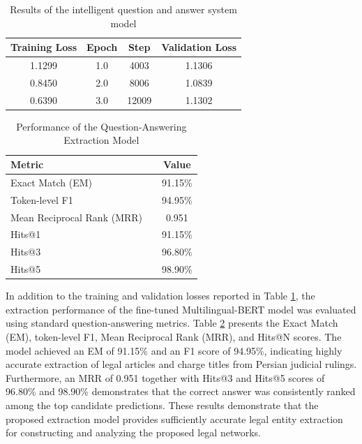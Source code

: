 \documentclass[twoside]{article}
\begin{document}
\begin{table}[!ht]
	\begin{center}
		\small
		\caption{Results of the intelligent question and answer system model}
		\label{tab1}
		\begin{tabular}{cccc}
			\hline
			\textbf{Training Loss} & \textbf{Epoch} & \textbf{Step} & \textbf{Validation Loss} \\
			\hline
			1.1299 & 1.0 & 4003 & 1.1306 \\
			0.8450 & 2.0 & 8006 & 1.0839 \\
			0.6390 & 3.0 & 12009 & 1.1302 \\
			\hline
		\end{tabular}
	\end{center}\vspace{-0.6cm}
\end{table}
\begin{table}[!ht]
	\begin{center}
		\small
		\caption{Performance of the Question-Answering Extraction Model}
		\label{tab2}
		\begin{tabular}{lcc}
			\hline
			\textbf{Metric} & &\textbf{Value} \\
			\hline
			Exact Match (EM) && 91.15\% \\
			Token-level F1 & &94.95\% \\
			Mean Reciprocal Rank (MRR) && 0.951 \\
			Hits@1 && 91.15\% \\
			Hits@3 && 96.80\% \\
			Hits@5 && 98.90\% \\
			\hline
		\end{tabular}
	\end{center}
\end{table}
In addition to the training and validation losses reported in Table \ref{tab1}, the extraction performance of the fine-tuned Multilingual-BERT model was evaluated using standard question-answering metrics. Table \ref{tab2} presents the Exact Match (EM), token-level F1, Mean Reciprocal Rank (MRR), and Hits@N scores. The model achieved an EM of 91.15\% and an F1 score of 94.95\%, indicating highly accurate extraction of legal articles and charge titles from Persian judicial rulings. Furthermore, an MRR of 0.951 together with Hits@3 and Hits@5 scores of 96.80\% and 98.90\% demonstrates that the correct answer was consistently ranked among the top candidate predictions. These results demonstrate that the proposed extraction model provides sufficiently accurate legal entity extraction for constructing and analyzing the proposed legal networks.
\end{document}
